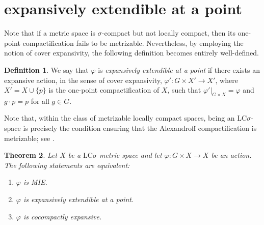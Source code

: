 \documentclass[12pt]{amsart}
\theoremstyle{plain}
\newtheorem{theorem}{Theorem}[section]
\theoremstyle{definition}
\newtheorem{definition}[theorem]{Definition}
\theoremstyle{remark}
\begin{document}
\section{expansively extendible at a point}

Note that if a metric space is $\sigma$-compact but not locally compact, then its one-point compactification fails to be metrizable. Nevertheless, by employing the notion of cover expansivity, the following definition becomes entirely well-defined.

\begin{definition}
We say that \(\varphi\) is \emph{expansively extendible at a point} if there exists an expansive action, in the sense of cover expansivity, \(\varphi' : G \times X' \to X'\), where \(X' = X \cup \{ p \}\) is the one-point compactification of \(X\), such that \(\varphi'|_{G \times X} = \varphi\) and \(g \cdot p = p\) for all \(g \in G\).
\end{definition}



Note that, within the class of metrizable locally compact spaces, being an \(\mathrm{LC}\sigma\)-space is precisely the condition ensuring that the Alexandroff compactification is metrizable; see \cite[Definition~5.1 and Theorem~5.3]{Kechris}.

\begin{theorem} \label{TeoEquiv}
Let \( X \) be a $\text{LC}\sigma$ metric space and let \( \varphi : G \times X \to X \) be an action. The following statements are equivalent:
\begin{enumerate}
\item \( \varphi \) is MIE.
\item \( \varphi \) is expansively extendible at a point.
\item \( \varphi \) is cocompactly expansive.
\end{enumerate} 
\end{theorem}
\end{document}
